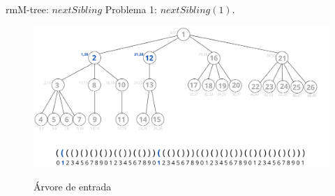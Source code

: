  \begin{frame}{rmM-tree: $nextSibling$}
    Problema 1:  $nextSibling(1)$.
     \begin{figure}[h!]
         \centering
         \includegraphics[scale=0.40]{images/nextSibling-res.png}\\
         \caption{Árvore de entrada}
     \end{figure} 
 \end{frame}

 





